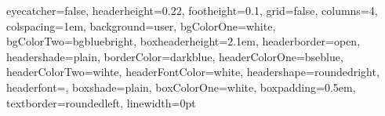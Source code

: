 \documentclass[a0paper, portrait, margin=2em, fontscale=0.292]{baposter}
\begin{document}
\begin{poster}
{
eyecatcher=false, %
headerheight=0.22\textheight, %
footheight=0.1\textheight, %
%
grid=false,
columns={4}, %
colspacing=1em, %
%
background=user, %
bgColorOne=white, %
bgColorTwo=bgbluebright, %
%
%
boxheaderheight=2.1em,
headerborder=open, %
headershade=plain,
borderColor=darkblue, %
headerColorOne=bseblue, %
headerColorTwo=wihte, %
headerFontColor=white, %
headershape=roundedright, %
headerfont=\Large\textsf, %
%
boxshade=plain,
boxColorOne=white, %
boxpadding=0.5em,
textborder=roundedleft, %
linewidth=0pt %
}
\end{poster}
\end{document}
